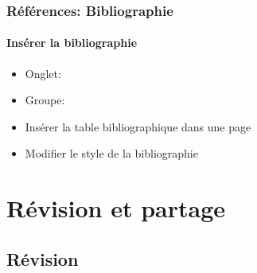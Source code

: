 \documentclass[xcolor=table]{beamer}
\begin{document}
\begin{frame}[t]
\frametitle{Références: Bibliographie}
\framesubtitle{Insérer la bibliographie}

\begin{minipage}{0.38\textwidth}
	\begin{itemize}
		\item Onglet: 
		\item Groupe: 
		\item Insérer la table bibliographique dans une page
		\item Modifier le style de la bibliographie
	\end{itemize}
\end{minipage}
\begin{minipage}{0.35\textwidth}
\end{minipage}
\begin{minipage}{0.25\textwidth}
	\vspace{1cm}
\end{minipage}

\end{frame}

\section{Révision et partage}

%

\subsection{Révision}
\end{document}
